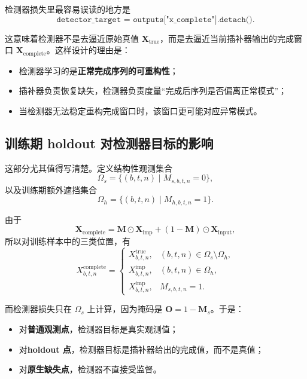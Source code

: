 \documentclass[UTF8]{ctexart}
\begin{document}
检测器损失里最容易误读的地方是
\begin{equation}
    \texttt{detector\_target = outputs["x\_complete"].detach()}.
\end{equation}

这意味着检测器不是去逼近原始真值 \(\bm{X}_{\text{true}}\)，而是去逼近当前插补器输出的完成窗口 \(\bm{X}_{\text{complete}}\)。这样设计的理由是：
\begin{itemize}
    \item 检测器学习的是\textbf{正常完成序列的可重构性}；
    \item 插补器负责恢复缺失，检测器负责度量“完成后序列是否偏离正常模式”；
    \item 当检测器无法稳定重构完成窗口时，该窗口更可能对应异常模式。
\end{itemize}

\subsection{训练期 holdout 对检测器目标的影响}

这部分尤其值得写清楚。定义结构性观测集合
\begin{equation}
    \Omega_s = \{(b,t,n)\mid M_{s,b,t,n}=0\},
\end{equation}
以及训练期额外遮挡集合
\begin{equation}
    \Omega_h = \{(b,t,n)\mid M_{h,b,t,n}=1\}.
\end{equation}

由于
\begin{equation}
    \bm{X}_{\text{complete}}
    =
    \bm{M}\odot \bm{X}_{\text{imp}} + (1-\bm{M})\odot \bm{X}_{\text{input}},
\end{equation}
所以对训练样本中的三类位置，有
\begin{equation}
    X^{\text{complete}}_{b,t,n}
    =
    \begin{cases}
        X^{\text{true}}_{b,t,n}, & (b,t,n)\in \Omega_s \setminus \Omega_h, \\[4pt]
        X^{\text{imp}}_{b,t,n}, & (b,t,n)\in \Omega_h, \\[4pt]
        X^{\text{imp}}_{b,t,n}, & M_{s,b,t,n}=1.
    \end{cases}
\end{equation}

而检测器损失只在 \(\Omega_s\) 上计算，因为掩码是 \(\bm{O}=1-\bm{M}_s\)。于是：
\begin{itemize}
    \item 对\textbf{普通观测点}，检测器目标是真实观测值；
    \item 对\textbf{holdout 点}，检测器目标是插补器给出的完成值，而不是真值；
    \item 对\textbf{原生缺失点}，检测器不直接受监督。
\end{itemize}
\end{document}
